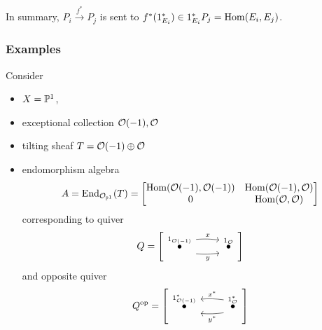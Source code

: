 \documentclass[12pt]{article}
\begin{document}
In summary, $P_i \xrightarrow{f^*} P_j$ is sent to $f^*(1_{E_i}^*) \in 1_{E_i}^* P_j = \Hom(E_i,E_j)$.

\subsubsection{Examples}

Consider
\begin{itemize}
    \item $X=\P^1$,
    \item exceptional collection $\cO(-1),\cO$
    \item tilting sheaf $T=\cO(-1)\oplus \cO$
    \item endomorphism algebra
    \[A=\End_{\cO_{\P^1}}(T) = \begin{bmatrix}
        \Hom(\cO(-1),\cO(-1)) & \Hom(\cO(-1),\cO)\\
        0 & \Hom(\cO,\cO)
    \end{bmatrix}\]
    corresponding to quiver
    \[Q = \left[\begin{tikzcd}
        \overset{1_{\cO(-1)}}{\bullet} \rar[shift left=0.2cm, bend left=0.2cm, "x"] \rar[shift left=-0.2cm, bend left=-0.2cm, "y"'] & \overset{1_{\cO}}{\bullet}
    \end{tikzcd}\right]\]
    and opposite quiver
    \[Q^\op = \left[\begin{tikzcd}
        \overset{1_{\cO(-1)}^*}{\bullet} & \overset{1_{\cO}^*}{\bullet} \lar[shift left=0.2cm, bend left=0.2cm, "y^*"] \lar[shift left=-0.2cm, bend left=-0.2cm, "x^*"']
    \end{tikzcd}\right]\]
\end{itemize}
\end{document}
